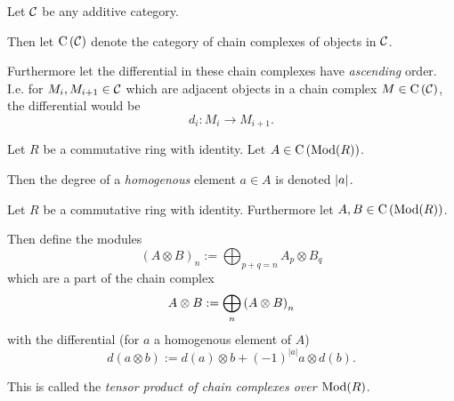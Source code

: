 \begin{notation}
    Let \( {\mathcal{C}} \) be any additive category.
    
    Then let \( \operatorname{C} \left( {\mathcal{C}} \right) \) denote the category of chain complexes of objects in \( {\mathcal{C}} \).

    Furthermore let the differential in these chain complexes have \emph{ascending} order. I.e. for \( M_i, M_{i+1} \in {\mathcal{C}} \) which are adjacent objects in a chain complex \( M \in \operatorname{C} \left( {\mathcal{C}} \right) \), the differential would be
    \[
        d_i : M_i \to M_{i + 1}.
    \]
\end{notation}

\begin{notation}
    Let \( R \) be a commutative ring with identity. Let \( A \in \operatorname{C} \left( \operatorname{Mod}(R) \right) \).

    Then the degree of a \emph{homogenous} element \( a \in A \) is denoted \emph{\( \lvert a \rvert \)}.
\end{notation}

\begin{definition}
    \label{def:massey_product_in_dg_cat/what_is_a_dg_cat/tensor_product_of_chain_complexes}
    Let \( R \) be a commutative ring with identity. Furthermore let \( A, B \in \operatorname{C} \left( \operatorname{Mod}(R) \right) \).

    Then define the modules
    \[
        (A \otimes B)_n := \bigoplus_{p + q = n} A_p \otimes B_q
    \]
    which are a part of the chain complex
    \[
        A \otimes B := \bigoplus_n \left( A \otimes B \right)_n
    \]
    with the differential (for \( a \) a homogenous element of \( A \))
    \[
        d(a \otimes b) := d(a) \otimes b + (-1)^{|a|} a \otimes d(b).
    \]

    This is called the \emph{tensor product of chain complexes over \( \operatorname{Mod}(R) \)}.
\end{definition}



